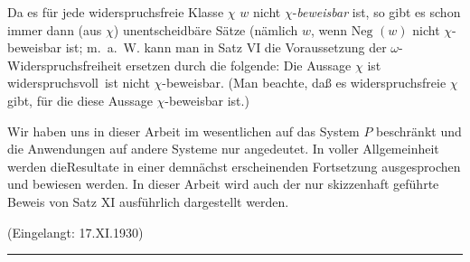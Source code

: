 \documentclass{scrartcl}
\begin{document}
Da es für jede widerspruchsfreie Klasse $\chi$ $w$ nicht $\chi$-\textit{beweisbar} ist, so gibt es schon immer dann (aus $\chi$) unentscheidbäre Sätze (nämlich $w$, wenn $\text{Neg }(w)$ nicht $\chi$-beweisbar ist; m.~a.~W. kann man in Satz VI die Voraussetzung der $\omega$-Widerspruchsfreiheit ersetzen durch die folgende: Die Aussage
\glqq $\chi$ ist widerspruchsvoll\grqq\ ist nicht $\chi$-beweisbar. (Man beachte, daß es widerspruchsfreie $\chi$ gibt, für die diese Aussage $\chi$-beweisbar ist.)

Wir haben uns in dieser Arbeit im wesentlichen auf das System $P$ beschränkt und die Anwendungen auf andere Systeme nur angedeutet. In voller Allgemeinheit werden dieResultate in einer demnächst erscheinenden Fortsetzung ausgesprochen und bewiesen werden. In dieser Arbeit wird auch der nur skizzenhaft geführte Beweis von Satz XI ausführlich dargestellt werden.

\begin{center}
(Eingelangt: 17.XI.1930)
\end{center}
\vspace{0.5cm}
\begin{center}
\rule{2cm}{0.01cm}
\end{center}
\end{document}

